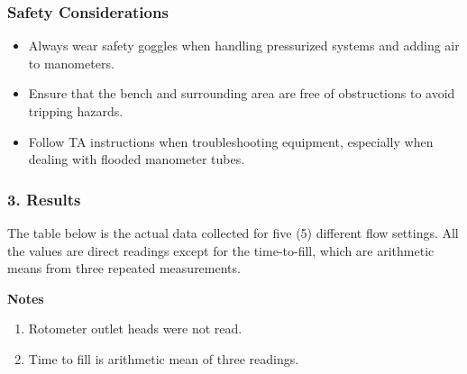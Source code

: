 \documentclass[11pt]{article}
\providecommand{\tightlist}{%
      \setlength{\itemsep}{0pt}\setlength{\parskip}{0pt}}
\begin{document}
\hypertarget{safety-considerations}{%
\subsubsection{Safety Considerations}\label{safety-considerations}}

\begin{itemize}
\tightlist
\item
  Always wear safety goggles when handling pressurized systems and
  adding air to manometers.
\item
  Ensure that the bench and surrounding area are free of obstructions to
  avoid tripping hazards.
\item
  Follow TA instructions when troubleshooting equipment, especially when
  dealing with flooded manometer tubes.
\end{itemize}

    \hypertarget{results}{%
\subsubsection{3. Results}\label{results}}

The table below is the actual data collected for five (5) different flow
settings. All the values are direct readings except for the
time-to-fill, which are arithmetic means from three repeated
measurements.

\textbf{Notes}

\begin{enumerate}
\def\labelenumi{\arabic{enumi}.}
\tightlist
\item
  Rotometer outlet heads were not read.
\item
  Time to fill is arithmetic mean of three readings.
\end{enumerate}
\end{document}
